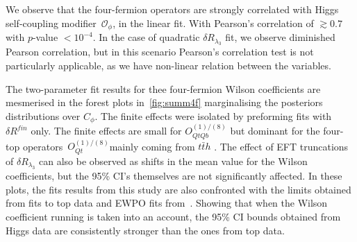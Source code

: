 We observe that the four-fermion operators are strongly correlated with Higgs self-coupling modifier~$\mathcal O_\phi$, in the linear fit. With Pearson's correlation of $ \gtrsim 0.7$ with $p$-value $< 10^{-4}$.  In the case of quadratic $\delta R_{\lambda_3}$ fit, we observe diminished Pearson correlation, but in this scenario Pearson's correlation test is not particularly applicable, as we have non-linear relation between the variables.
%
 \par The two-parameter fit results for thee four-fermion Wilson coefficients are mesmerised in the forest plots in~\autoref{fig:summ4f} marginalising the posteriors distributions over $C_\phi$. The finite effects were isolated by preforming fits with $\delta R^{fin}$ only. The finite effects are small for  $O_{QtQb}^{(1)/(8)}$ but dominant for the four-top operators~$O_{Qt}^{(1)/(8)}$mainly coming from $t\bar t h$ .    The effect of EFT truncations of $\delta R_{\lambda_3}$ can also be observed as shifts in the mean value for the Wilson coefficients, but the 95\% CI's themselves are not significantly affected.  In these plots, the fits results from this study are also confronted with the limits obtained from fits to top data \cite{Ethier:2021bye, Ellis:2020unq, Hartland:2019bjb,Brivio:2019ius,DHondt:2018cww, Zhang:2017mls} and EWPO fits from~\cite{Dawson:2022bxd}. Showing that when the Wilson coefficient running is taken into an account, the 95\% CI  bounds obtained from Higgs data are consistently stronger than the ones from top data.
